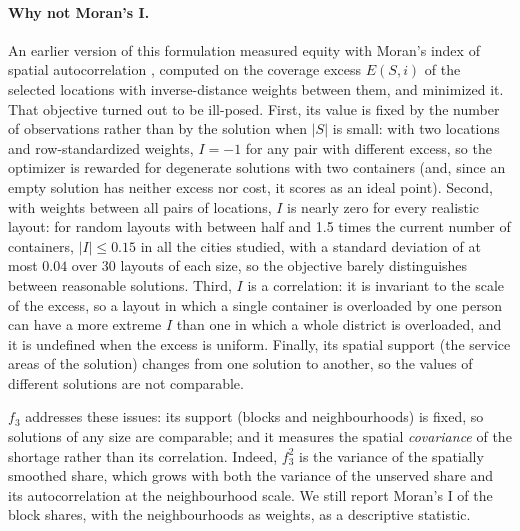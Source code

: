 \paragraph{Why not Moran's I.}
An earlier version of this formulation measured equity with Moran's index of spatial autocorrelation \cite{moran1950notes}, computed on the coverage excess $E(S,i)$ of the selected locations with inverse-distance weights between them, and minimized it. That objective turned out to be ill-posed. First, its value is fixed by the number of observations rather than by the solution when $|S|$ is small: with two locations and row-standardized weights, $I = -1$ for any pair with different excess, so the optimizer is rewarded for degenerate solutions with two containers (and, since an empty solution has neither excess nor cost, it scores as an ideal point). Second, with weights between all pairs of locations, $I$ is nearly zero for every realistic layout: for random layouts with between half and 1.5 times the current number of containers, $|I| \leq 0.15$ in all the cities studied, with a standard deviation of at most $0.04$ over 30 layouts of each size, so the objective barely distinguishes between reasonable solutions. Third, $I$ is a correlation: it is invariant to the scale of the excess, so a layout in which a single container is overloaded by one person can have a more extreme $I$ than one in which a whole district is overloaded, and it is undefined when the excess is uniform. Finally, its spatial support (the service areas of the solution) changes from one solution to another, so the values of different solutions are not comparable.

$f_3$ addresses these issues: its support (blocks and neighbourhoods) is fixed, so solutions of any size are comparable; and it measures the spatial \emph{covariance} of the shortage rather than its correlation. Indeed, $f_3^2$ is the variance of the spatially smoothed share, which grows with both the variance of the unserved share and its autocorrelation at the neighbourhood scale. We still report Moran's I of the block shares, with the neighbourhoods as weights, as a descriptive statistic.

